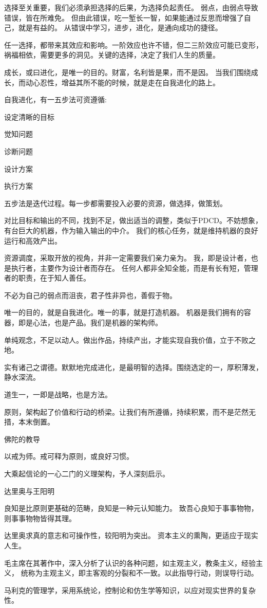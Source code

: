 选择至关重要，我们必须承担选择的后果，为选择负起责任。
弱点，由弱点导致错误，皆在所难免。
但由此错误，吃一堑长一智，如果能通过反思而增强了自己，就是有益的。
从错误中学习，进步，进化，是通向成功的捷径。

任一选择，都带来其效应和影响。一阶效应也许不错，但二三阶效应可能已变形，
祸福相依，需要更多的洞见。关键的选择，决定了我们人生的质量。

成长，或曰进化，是唯一的目的。财富，名利皆是果，而不是因。
当我们围绕成长，而动心忍性，增益其所不能的时候，就是走在自我进化的路上。

自我进化，有一五步法可资遵循:
\begin{enumbox}
\item 设定清晰的目标
\item 觉知问题
\item 诊断问题
\item 设计方案
\item 执行方案
\end{enumbox}

五步法是迭代过程。每一步都需要投入必要的资源，做选择，做策划。

对比目标和输出的不同，找到不足，做出适当的调整，类似于PDCD。不妨想象，有台巨大的机器，作为输入输出的中介。
我们的核心任务，就是维持机器的良好运行和高效产出。

资源调度，采取开放的视角，并非一定需要我们亲力亲为。
我，即是设计者，也是执行者，主要作为设计者而存在。
任何人都非全知全能，而是有长有短，管理者的职责，在于知人善任。

不必为自己的弱点而沮丧，君子性非异也，善假于物。

唯一的目的，就是自我进化。唯一的事，就是打造机器。
机器是我们拥有的容器，即是心法，也是产品。我们是机器的架构师。

单纯观念，不足以动人。做出作品，持续产出，才能实现自我价值，立于不败之地。

实有诸己之谓德。默默地完成进化，是最明智的选择。围绕选定的一，厚积薄发，静水深流。

道生一，一即是战略，也是方法。

原则，架构起了价值和行动的桥梁。让我们有所遵循，持续积累，而不是茫然无措，本末倒置。

佛陀的教导

以戒为师。戒可释为原则，或良好习惯。

大乘起信论的一心二门的义理架构，予人深刻启示。

达里奥与王阳明

良知是比原则更基础的范畴，良知是一种元认知能力。
致吾心良知于事事物物，则事事物物皆得其理。

达里奥求真的意志和可操作性，较阳明为突出。
资本主义的熏陶，更适应于现实人生。

毛主席在其著作中，深入分析了认识的各种问题，如主观主义，教条主义，经验主义，
统称为主观主义，即主客观的分裂和不一致。以此指导行动，则误导行动。

马利克的管理学，采用系统论，控制论和仿生学等知识，以应对现实世界的复杂性。

